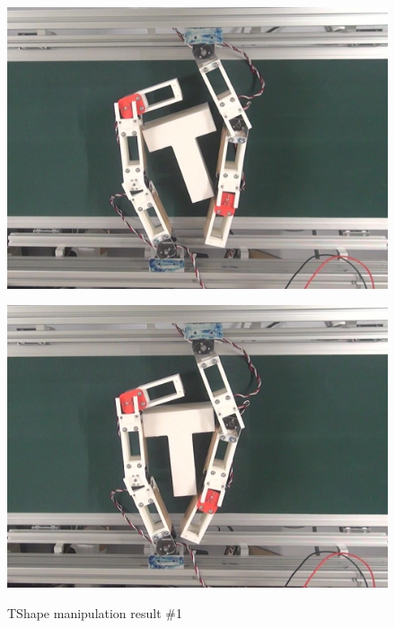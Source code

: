 \documentclass[a4paper,twoside,12pt,papersize, dvipdfmx]{iirthesis}
\begin{document}
\begin{figure}[b]
\begin{minipage}{0.249\hsize}
\includegraphics[width=0.98\hsize]{fig/4-manipulation-result/TShape/1-3.jpg}
\subcaption{}\label{}
\end{minipage}\hfill
\begin{minipage}{0.249\hsize}
\centering
\includegraphics[width=0.98\hsize]{fig/4-manipulation-result/TShape/1-4.jpg}
\subcaption{}\label{}
\end{minipage}
\caption{TShape manipulation result \#1}\label{fig::result::tm1}


\end{figure}
\end{document}
